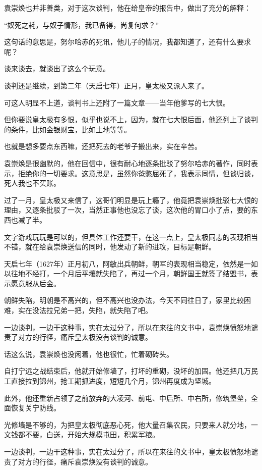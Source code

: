 \begin{multicols}{\theparacolNo}
		袁崇焕也并非善类，对于这次谈判，他在给皇帝的报告中，做出了充分的解释：

		“奴死之耗，与奴子情形，我已备得，尚复何求？”

		这句话的意思是，努尔哈赤的死讯，他儿子的情况，我都知道了，还有什么要求呢？

		谈来谈去，就谈出了这么个玩意。

		谈判还是继续，到第二年（天启七年）正月，皇太极又派人来了。

		可这人明显不上道，谈判书上还附了一篇文章——当年他爹写的七大恨。

		但你要说皇太极有多恨，似乎也说不上，因为，就在七大恨后面，他还列上了谈判的条件，比如金银财宝，比如土地等等。

		也就是想多要点东西嘛，还把死去的老爷子搬出来，实在辛苦。

		袁崇焕是很幽默的，他在回信中，很有耐心地逐条批驳了努尔哈赤的著作，同时表示，拒绝你的一切要求。这意思是，虽然你爸憋屈死了，我表示同情，但谈归谈，死人我也不买账。

		过了一月，皇太极又来信了，这哥们明显是玩上瘾了，他竟把袁崇焕批驳七大恨的理由，又逐条批驳了一次，当然正事他也没忘了谈，这次他的胃口小了点，要的东西也减了半。

		文字游戏玩玩是可以的，但具体工作还要干，在这一点上，皇太极同志的表现相当不错，就在给袁崇焕送信的同时，他发动了新的进攻，目标是朝鲜。

		天启七年（1627年）正月初八，阿敏出兵朝鲜，朝军的表现相当稳定，依然是一如以往地不经打，一个月后平壤就失陷了，再过一个月，朝鲜国王就签了结盟书，表示愿意服从后金。

		朝鲜失陷，明朝是不高兴的，但不高兴也没办法，今天不同往日了，家里比较困难，实在没法拉兄弟一把，失陷，就失陷了吧。

		一边谈判，一边干这种事，实在太过分了，所以在来往的文书中，袁崇焕愤怒地谴责了对方的行径，痛斥皇太极没有谈判的诚意。

		话这么说，袁崇焕也没闲着，他也很忙，忙着砌砖头。

		自打宁远之战结束后，他就开始修墙了，打坏的重砌，没坏的加固。他还把几万民工直接拉到锦州，抢工期抓进度，短短几个月，锦州再度成为坚城。

		此外，他还重新占领了之前放弃的大凌河、前屯、中后所、中右所，修筑堡垒，全面恢复关宁防线。

		光修墙是不够的，为把皇太极彻底恶心死，他大量召集农民，只要来人就分地，一文钱都不要，白送，开始大规模屯田，积累军粮。

		一边谈判，一边干这种事，实在太过分了，所以在来往的文书中，皇太极愤怒地谴责了对方的行径，痛斥袁崇焕没有谈判的诚意。


\end{multicols}
